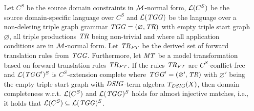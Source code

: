\begin{theorem}
\label{thm:sec-dom-compl-mt-without-acs}
Let $C^S$ be the source domain constraints in ${\cal M}$-normal form, $\mathcal{L}(C^S)$ be the source domain-specific language over $C^S$ and $\mathcal{L}(\mathit{TGG})$ be the language over a non-deleting triple graph grammar $\mathit{TGG}=(\varnothing,\mathit{TR})$ with empty triple start graph $\varnothing$, all triple productions $\mathit{TR}$ being non-trivial and where all application conditions are in ${\cal M}$-normal form.
Let $\mathit{TR}_\mathit{FT}$ be the derived set of forward translation rules from $\mathit{TGG}$.
Furthermore, let $\mathit{MT}$ be a model transformation based on forward translation rules $\mathit{TR}_\mathit{FT}$.
If the rules $\mathit{TR}_\mathit{FT}$ are $C^S$-conflict-free and $\mathcal{L}(\mathit{TGG}')^S$ is $C^S$-extension complete where $\mathit{TGG}'=(\varnothing',\mathit{TR})$ with $\varnothing'$ being the empty triple start graph with $\mathit{DSIG}$-term algebra $T_\mathit{DSIG}(X)$, then domain completeness w.r.t. $\mathcal{L}(C^S)$ and $\mathcal{L}(\mathit{TGG})^S$ holds for almost injective matches, i.e., it holds that $\mathcal{L}(C^S) \subseteq \mathcal{L}(\mathit{TGG})^S$.
\envEndMarker
\end{theorem}

